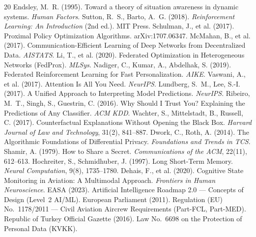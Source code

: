 \documentclass[11pt]{article}
\begin{document}
\begin{thebibliography}{20}\small
{} Endsley, M.~R. (1995). Toward a theory of situation awareness in dynamic systems. \emph{Human Factors}.
 Sutton, R.~S., Barto, A.~G. (2018). \emph{Reinforcement Learning: An Introduction} (2nd ed.). MIT Press.
 Schulman, J., et al. (2017). Proximal Policy Optimization Algorithms. arXiv:1707.06347.
 McMahan, B., et al. (2017). Communication-Efficient Learning of Deep Networks from Decentralized Data. \emph{AISTATS}.
 Li, T., et al. (2020). Federated Optimization in Heterogeneous Networks (FedProx). \emph{MLSys}.
 Nadiger, C., Kumar, A., Abdelhak, S. (2019). Federated Reinforcement Learning for Fast Personalization. \emph{AIKE}.
 Vaswani, A., et al. (2017). Attention Is All You Need. \emph{NeurIPS}.
 Lundberg, S.~M., Lee, S.-I. (2017). A Unified Approach to Interpreting Model Predictions. \emph{NeurIPS}.
 Ribeiro, M.~T., Singh, S., Guestrin, C. (2016). Why Should I Trust You? Explaining the Predictions of Any Classifier. \emph{ACM KDD}.
 Wachter, S., Mittelstadt, B., Russell, C. (2017). Counterfactual Explanations Without Opening the Black Box. \emph{Harvard Journal of Law and Technology}, 31(2), 841--887.
 Dwork, C., Roth, A. (2014). The Algorithmic Foundations of Differential Privacy. \emph{Foundations and Trends in TCS}.
 Shamir, A. (1979). How to Share a Secret. \emph{Communications of the ACM}, 22(11), 612--613.
 Hochreiter, S., Schmidhuber, J. (1997). Long Short-Term Memory. \emph{Neural Computation}, 9(8), 1735--1780.
 Dehais, F., et al. (2020). Cognitive State Monitoring in Aviation: A Multimodal Approach. \emph{Frontiers in Human Neuroscience}.
 EASA (2023). Artificial Intelligence Roadmap 2.0 --- Concepts of Design (Level~2 AI/ML).
 European Parliament (2011). Regulation (EU) No.~1178/2011 --- Civil Aviation Aircrew Requirements (Part-FCL, Part-MED).
 Republic of Turkey Official Gazette (2016). Law No.~6698 on the Protection of Personal Data (KVKK).
\end{thebibliography}
\end{document}

